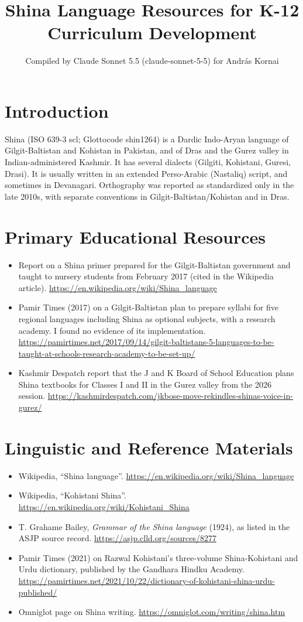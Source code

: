 \documentclass[12pt]{article}
\title{Shina Language Resources for K-12 Curriculum Development}
\author{Compiled by Claude Sonnet 5.5 (claude-sonnet-5-5) for Andr\'as Kornai}
\date{}
\begin{document}
\maketitle

\section{Introduction}
Shina (ISO 639-3 scl; Glottocode shin1264) is a Dardic Indo-Aryan language of Gilgit-Baltistan and Kohistan in Pakistan, and of Dras and the Gurez valley in Indian-administered Kashmir. It has several dialects (Gilgiti, Kohistani, Guresi, Drasi). It is usually written in an extended Perso-Arabic (Nastaliq) script, and sometimes in Devanagari. Orthography was reported as standardized only in the late 2010s, with separate conventions in Gilgit-Baltistan/Kohistan and in Dras.

\section{Primary Educational Resources}
\begin{itemize}
\item Report on a Shina primer prepared for the Gilgit-Baltistan government and taught to nursery students from February 2017 (cited in the Wikipedia article). \url{https://en.wikipedia.org/wiki/Shina_language}
\item Pamir Times (2017) on a Gilgit-Baltistan plan to prepare syllabi for five regional languages including Shina as optional subjects, with a research academy. I found no evidence of its implementation. \url{https://pamirtimes.net/2017/09/14/gilgit-baltistans-5-languages-to-be-taught-at-schools-research-academy-to-be-set-up/}
\item Kashmir Despatch report that the J and K Board of School Education plans Shina textbooks for Classes I and II in the Gurez valley from the 2026 session. \url{https://kashmirdespatch.com/jkbose-move-rekindles-shinas-voice-in-gurez/}
\end{itemize}

\section{Linguistic and Reference Materials}
\begin{itemize}
\item Wikipedia, ``Shina language''. \url{https://en.wikipedia.org/wiki/Shina_language}
\item Wikipedia, ``Kohistani Shina''. \url{https://en.wikipedia.org/wiki/Kohistani_Shina}
\item T. Grahame Bailey, \emph{Grammar of the Shina language} (1924), as listed in the ASJP source record. \url{https://asjp.clld.org/sources/8277}
\item Pamir Times (2021) on Razwal Kohistani's three-volume Shina-Kohistani and Urdu dictionary, published by the Gandhara Hindku Academy. \url{https://pamirtimes.net/2021/10/22/dictionary-of-kohistani-shina-urdu-published/}
\item Omniglot page on Shina writing. \url{https://omniglot.com/writing/shina.htm}
\end{itemize}
\end{document}
